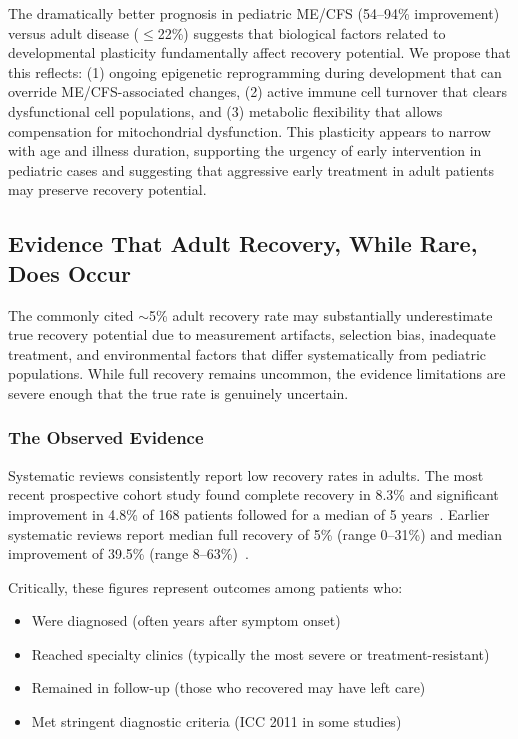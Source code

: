 \begin{hypothesis}
\label{hyp:developmental-window}
The dramatically better prognosis in pediatric ME/CFS (54--94\% improvement)
versus adult disease ($\leq$22\%) suggests that biological factors related to
developmental plasticity fundamentally affect recovery potential. We propose
that this reflects: (1) ongoing epigenetic reprogramming during development
that can override ME/CFS-associated changes, (2) active immune cell turnover
that clears dysfunctional cell populations, and (3) metabolic flexibility that
allows compensation for mitochondrial dysfunction. This plasticity appears to
narrow with age and illness duration, supporting the urgency of early
intervention in pediatric cases and suggesting that aggressive early treatment
in adult patients may preserve recovery potential.
\end{hypothesis}

\subsection{Evidence That Adult Recovery, While Rare, Does Occur}
\label{sec:adult-recovery-evidence}

\begin{keypoint}
The commonly cited $\sim$5\% adult recovery rate may substantially underestimate true recovery potential due to measurement artifacts, selection bias, inadequate treatment, and environmental factors that differ systematically from pediatric populations. While full recovery remains uncommon, the evidence limitations are severe enough that the true rate is genuinely uncertain.
\end{keypoint}

\subsubsection{The Observed Evidence}

Systematic reviews consistently report low recovery rates in adults. The most recent prospective cohort study found complete recovery in 8.3\% and significant improvement in 4.8\% of 168 patients followed for a median of 5 years~\cite{Lacourt2022prognosis}. Earlier systematic reviews report median full recovery of 5\% (range 0--31\%) and median improvement of 39.5\% (range 8--63\%)~\cite{Cairns2005prognosis}.

Critically, these figures represent outcomes among patients who:
\begin{itemize}
    \item Were diagnosed (often years after symptom onset)
    \item Reached specialty clinics (typically the most severe or treatment-resistant)
    \item Remained in follow-up (those who recovered may have left care)
    \item Met stringent diagnostic criteria (ICC 2011 in some studies)
\end{itemize}


